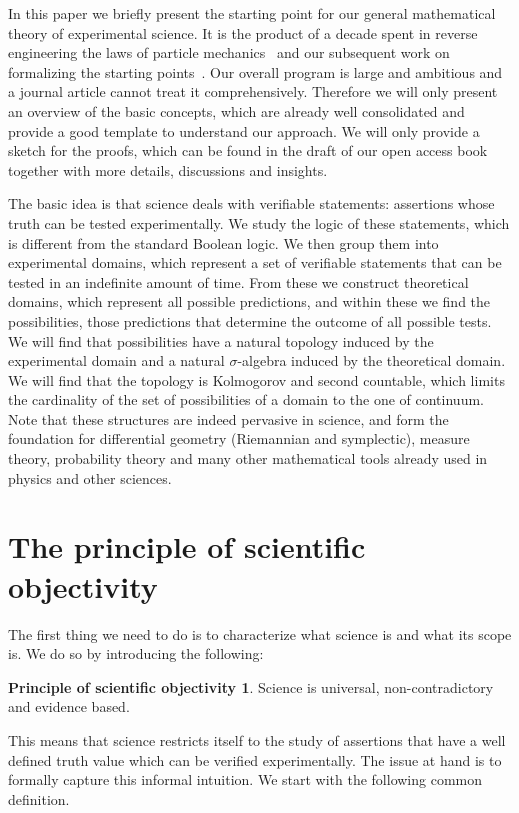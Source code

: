 \documentclass[letterpaper]{article}
\theoremstyle{plain}%
\theoremstyle{definition}
\newtheorem*{principle*}{Principle of scientific objectivity}
\theoremstyle{remark}
\numberwithin{equation}{section}
\begin{document}
In this paper we briefly present the starting point for our general mathematical theory of experimental science. It is the product of a decade spent in reverse engineering the laws of particle mechanics~\cite{Carc1} and our subsequent work on formalizing the starting points~\cite{Carc2}. Our overall program is large and ambitious and a journal article cannot treat it comprehensively. Therefore we will only present an overview of the basic concepts, which are already well consolidated and provide a good template to understand our approach. We will only provide a sketch for the proofs, which can be found in the draft of our open access book~\cite{Carc3} together with more details, discussions and insights.

The basic idea is that science deals with verifiable statements: assertions whose truth can be tested experimentally. We study the logic of these statements, which is different from the standard Boolean logic. We then group them into experimental domains, which represent a set of verifiable statements that can be tested in an indefinite amount of time. From these we construct theoretical domains, which represent all possible predictions, and within these we find the possibilities, those predictions that determine the outcome of all possible tests. We will find that possibilities have a natural topology induced by the experimental domain and a natural $\sigma$-algebra induced by the theoretical domain. We will find that the topology is Kolmogorov and second countable, which limits the cardinality of the set of possibilities of a domain to the one of continuum. Note that these structures are indeed pervasive in science, and form the foundation for differential geometry (Riemannian and symplectic), measure theory, probability theory and many other mathematical tools already used in physics and other sciences.

\section{The principle of scientific objectivity}

The first thing we need to do is to characterize what science is and what its scope is. We do so by introducing the following:

\begin{principle*}
Science is universal, non-contradictory and evidence based.
\end{principle*}

This means that science restricts itself to the study of assertions that have a well defined truth value which can be verified experimentally. The issue at hand is to formally capture this informal intuition. We start with the following common definition.
\end{document}
